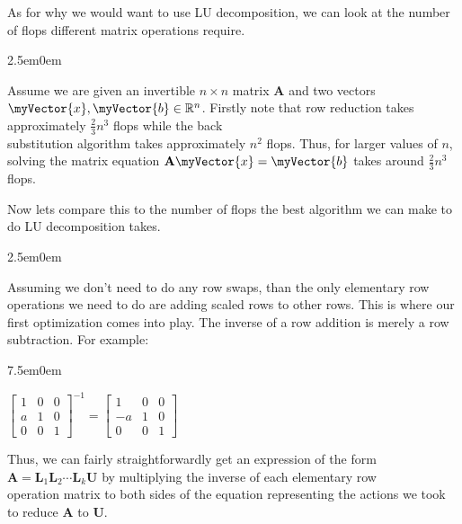 \documentclass{book}
\newcommand{\hTwo}{%
   \color{MidnightBlue}%
   \fontsize{13}{15}\selectfont%
}
\newcommand{\hThree}{%
   \color{PineGreen}
   \fontsize{13}{15}\selectfont%
}
\newenvironment{myIndent}{%
   \begin{adjustwidth}{2.5em}{0em}%
}{%
   \end{adjustwidth}%
}
\newenvironment{myTindent}{%
   \begin{adjustwidth}{7.5em}{0em}%
}{%
   \end{adjustwidth}%
}
\newcommand{\retTwo}{\hfill\bigbreak}
\newcommand{\mVec}[1]{\myVector{#1}}
\newcommand{\mMat}[1]{\mathbf{#1}}
\begin{document}
   As for why we would want to use LU decomposition, we can look at the number of flops different matrix operations require.
   \hTwo
   \begin{myIndent}
      Assume we are given an invertible $n\times n$ matrix $\mMat{A}$ and two vectors $\mVec{x}, \mVec{b} \in \mathbb{R}^n$. \retTwo
      Firstly note that row reduction takes approximately $\frac{2}{3}n^3$ flops while the back\\ substitution algorithm takes approximately $n^2$ flops. Thus, for larger values of $n$, solving the matrix equation $\mMat{A}\mVec{x} = \mVec{b}$ takes around $\frac{2}{3}n^3$ flops. \retTwo

      Now lets compare this to the number of flops the best algorithm we can make to do LU decomposition takes.
      
      {\begin{myIndent} \hThree
         Assuming we don't need to do any row swaps, than the only elementary row operations we need to do are adding scaled rows to other rows. This is where our first optimization comes into play. The inverse of a row addition is merely a row subtraction. For example:
            {\begin{myTindent} \hThree
               $\begin{bmatrix}
                  1 & 0 & 0 \\
                  a & 1 & 0 \\
                  0 & 0 & 1
               \end{bmatrix}^{-1} = \begin{bmatrix}
                  1 & 0 & 0 \\
                  -a & 1 & 0 \\
                  0 & 0 & 1
               \end{bmatrix}$ \retTwo
            \end{myTindent}}

         \newpage
         Thus, we can fairly straightforwardly get an expression of the form \\$ \mMat{A} = \mMat{L}_1 \mMat{L}_2 \cdots \mMat{L}_k \mMat{U}$ by multiplying the inverse of each elementary row \\operation matrix to both sides of the equation representing the actions we took to reduce $\mMat{A}$ to $\mMat{U}$. \retTwo


\end{myIndent}}
\end{myIndent}
\end{document}
